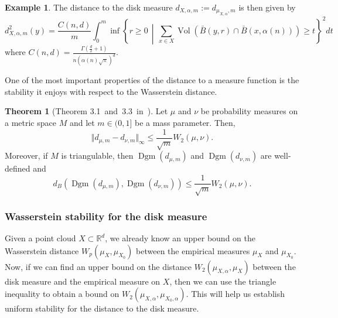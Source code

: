 \documentclass[10pt,a4paper]{article}
\theoremstyle{definition}
\newtheorem{thm}{Theorem}[section]
\newtheorem{ex}{Example}[thm]
\newcommand{\R}{\mathbb{R}}
\begin{document}
	\begin{ex}
	The distance to the disk measure $d_{X,\alpha, m} := d_{\mu_{X,\alpha}, m}$ is then given by
	$$
	d_{X,\alpha, m}^2(y) = \frac{C(n,d)}{m}\int_0^m\inf\left\{r\geq 0\,\middle\vert\,\sum_{x\in X}\operatorname{Vol}(\bar{B}(y,r)\cap\bar{B}(x,\alpha(n)))\geq t\right\}^2 dt
	$$
	where $C(n,d)=\frac{\Gamma(\frac{d}{2}+1)}{n(\alpha(n)\sqrt{\pi})^d}$.
	\end{ex}

	One of the most important properties of the distance to a measure function is the stability it enjoys with respect to the Wasserstein distance.
	\begin{thm}[Theorem 3.1~and~3.3~in~\autocite{Buchet2013}]
		Let $\mu$ and $\nu$ be probability measures on a metric space $M$ and let $m\in(0,1]$ be a mass parameter. Then,
		$$
		\Vert d_{\mu,m} - d_{\nu,m}\Vert_\infty\leq\frac{1}{\sqrt{m}}W_2(\mu, \nu).
		$$
		Moreover, if $M$ is triangulable, then $\operatorname{Dgm}(d_{\mu, m})$ and $\operatorname{Dgm}(d_{\nu, m})$ are well-defined and
		$$
		d_B(\operatorname{Dgm}(d_{\mu, m}), \operatorname{Dgm}(d_{\nu, m}))\leq\frac{1}{\sqrt{m}}W_2(\mu,\nu).
		$$
	\end{thm}

	\subsubsection{Wasserstein stability for the disk measure}
	Given a point cloud $X\subset\R^d$, we already know an upper bound on the Wasserstein distance $W_p(\mu_X, \mu_{X_0})$ between the empirical measures $\mu_X$ and $\mu_{X_0}$. Now, if we can find an upper bound on the distance $W_2(\mu_{X,\alpha}, \mu_X)$ between the disk measure and the empirical measure on $X$, then we can use the triangle inequality to obtain a bound on $W_2(\mu_{X,\alpha}, \mu_{X_0,\alpha})$. This will help us establish uniform stability for the distance to the disk measure.
	
\end{document}
